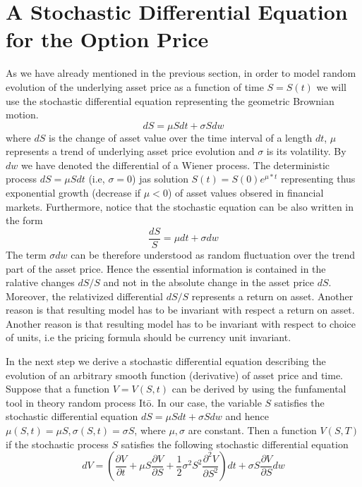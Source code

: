 \documentclass[a4paper]{article}
\begin{document}
\section{A Stochastic Differential Equation for the Option Price}
As we have already mentioned in the previous section, in order to model random evolution of the underlying asset price
as a function of time $S = S(t)$ we will use the stochastic differential equation representing the geometric Brownian motion.
\begin{equation}
    dS = \mu S dt + \sigma S dw
\end{equation}
where $dS$ is the change of asset value over the time interval of a length $dt$, $\mu$ represents a trend of underlying asset price evolution and $\sigma$ is its volatility. By $dw$ we have denoted the differential of a Wiener process. The deterministic 
process $dS = \mu S dt$ (i.e, $\sigma = 0$) jas solution $S(t) = S(0) e^{\mu * t}$ representing thus exponential growth (decrease if $\mu<0$) of asset values obsered in financial markets. Furthermore, notice that the stochastic equation can be also written in the form
\begin{equation}
    \frac{d S}{S}=\mu dt + \sigma dw
\end{equation}
The term $\sigma dw$ can be therefore understood as random fluctuation over the trend part of the asset price. Hence the essential information is contained in the ralative changes $dS/S$ and not in the absolute change in the asset price $dS$. Moreover, the relativized differential 
$dS / S$ represents a return on asset. Another reason is that resulting model has to be invariant with respect a return on asset. Another reason is that resulting model has to be invariant with respect to choice of units, i.e the pricing formula should be currency unit invariant. \par

In the next step we derive a stochastic differential equation describing the evolution of an arbitrary smooth function (derivative) of asset price and time. Suppose that a function $V=V(S,t)$ can be derived by using the funfamental tool in theory random process It\={o}. In our case, 
the variable $S$ satisfies the stochastic differential equation $dS= \mu S dt + \sigma S dw$ and hence $\mu(S, t)=\mu S, \sigma(S, t)=\sigma S$, where $\mu, \sigma$ are constant. Then a function $V(S,T)$ if the stochastic process $S$ satisfies the following stochastic differential equation
\begin{equation}
    d V=\left(\frac{\partial V}{\partial t}+\mu S \frac{\partial V}{\partial S}+\frac{1}{2} \sigma^{2} S^{2} \frac{\partial^{2} V}{\partial S^{2}}\right) d t+\sigma S \frac{\partial V}{\partial S} d w
\end{equation}
\end{document}
